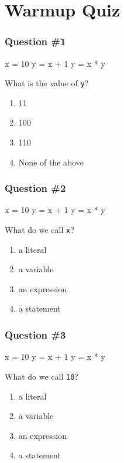 \documentclass[11pt]{beamer}
\begin{document}
\section{Warmup Quiz}


\begin{frame}[fragile]
  \frametitle{Question \#1}
  \Enlarge

  \begin{semiverbatim}
x = 10
y = x + 1
y = x * y
  \end{semiverbatim}
  What is the value of \texttt{y}?
  \begin{enumerate}[label=\Alph*]
  \item  11
  \item  100
  \item  110
  \item  None of the above
  \end{enumerate}
\end{frame}

\begin{frame}[fragile]
  \frametitle{Question \#2}
  \Enlarge

  \begin{semiverbatim}
x = 10
y = x + 1
y = x * y
  \end{semiverbatim}
  What do we call \texttt{x}?
  \begin{enumerate}[label=\Alph*]
  \item  a literal
  \item  a variable
  \item  an expression
  \item  a statement
  \end{enumerate}
\end{frame}

\begin{frame}[fragile]
  \frametitle{Question \#3}
  \Enlarge

  \begin{semiverbatim}
x = 10
y = x + 1
y = x * y
  \end{semiverbatim}
  What do we call \texttt{10}?
  \begin{enumerate}[label=\Alph*]
  \item  a literal
  \item  a variable
  \item  an expression
  \item  a statement
  \end{enumerate}
\end{frame}
\end{document}
